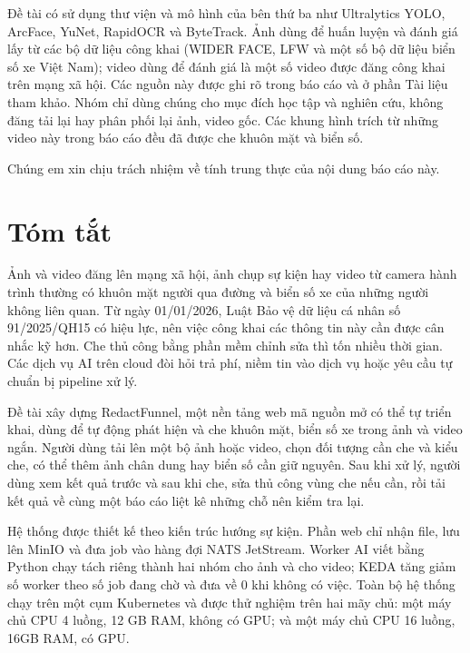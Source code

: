 \documentclass[a4paper,12pt]{article}
\begin{document}
Đề tài có sử dụng thư viện và mô hình của bên thứ ba như Ultralytics YOLO, ArcFace, YuNet, RapidOCR và ByteTrack. Ảnh dùng để huấn luyện và đánh giá lấy từ các bộ dữ liệu công khai (WIDER FACE, LFW và một số bộ dữ liệu biển số xe Việt Nam); video dùng để đánh giá là một số video được đăng công khai trên mạng xã hội. Các nguồn này được ghi rõ trong báo cáo và ở phần Tài liệu tham khảo. Nhóm chỉ dùng chúng cho mục đích học tập và nghiên cứu, không đăng tải lại hay phân phối lại ảnh, video gốc. Các khung hình trích từ những video này trong báo cáo đều đã được che khuôn mặt và biển số.

Chúng em xin chịu trách nhiệm về tính trung thực của nội dung báo cáo này.

\clearpage
\section*{Tóm tắt}
Ảnh và video đăng lên mạng xã hội, ảnh chụp sự kiện hay video từ camera hành trình thường có khuôn mặt người qua đường và biển số xe của những người không liên quan. Từ ngày 01/01/2026, Luật Bảo vệ dữ liệu cá nhân số 91/2025/QH15 có hiệu lực, nên việc công khai các thông tin này cần được cân nhắc kỹ hơn. Che thủ công bằng phần mềm chỉnh sửa thì tốn nhiều thời gian. Các dịch vụ AI trên cloud đòi hỏi trả phí, niềm tin vào dịch vụ hoặc yêu cầu tự chuẩn bị pipeline xử lý.

Đề tài xây dựng RedactFunnel, một nền tảng web mã nguồn mở có thể tự triển khai, dùng để tự động phát hiện và che khuôn mặt, biển số xe trong ảnh và video ngắn. Người dùng tải lên một bộ ảnh hoặc video, chọn đối tượng cần che và kiểu che, có thể thêm ảnh chân dung hay biển số cần giữ nguyên. Sau khi xử lý, người dùng xem kết quả trước và sau khi che, sửa thủ công vùng che nếu cần, rồi tải kết quả về cùng một báo cáo liệt kê những chỗ nên kiểm tra lại.

Hệ thống được thiết kế theo kiến trúc hướng sự kiện. Phần web chỉ nhận file, lưu lên MinIO và đưa job vào hàng đợi NATS JetStream. Worker AI viết bằng Python chạy tách riêng thành hai nhóm cho ảnh và cho video; KEDA tăng giảm số worker theo số job đang chờ và đưa về 0 khi không có việc. Toàn bộ hệ thống chạy trên một cụm Kubernetes và được thử nghiệm trên hai mãy chủ: một máy chủ CPU 4 luồng, 12 GB RAM, không có GPU; và một máy chủ CPU 16 luồng, 16GB RAM, có GPU.
\end{document}
